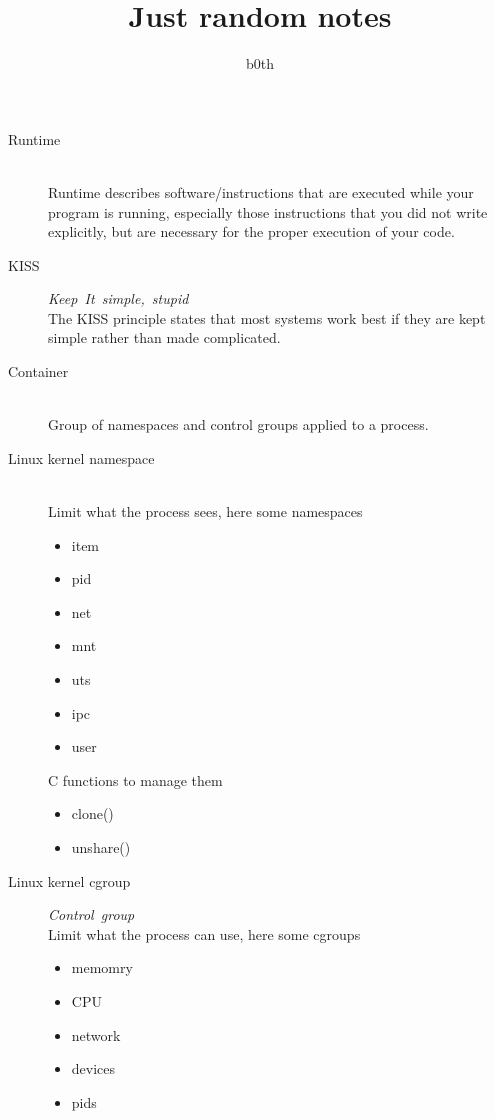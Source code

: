 \documentclass{article}
\title{Just random notes}
\author{b0th}
\begin{document}
\maketitle

\begin{description}
    \item[Runtime] \mbox{}\\Runtime describes software/instructions that are executed while your program is running, especially those instructions that you did not write explicitly, but are necessary for the proper execution of your code.
    \item[KISS] \mbox{\textit{Keep It simple, stupid}}\\ The KISS principle states that most systems work best if they are kept simple rather than made complicated.
    \item[Container] \mbox{}\\ Group of namespaces and control groups applied to a process.
    \item[Linux kernel namespace] \mbox{}\\ Limit what the process sees, here some namespaces
    
    \begin{itemize}
        \item item
        \item pid
        \item net
        \item mnt
        \item uts
        \item ipc
        \item user
    \end{itemize}

    C functions to manage them

    \begin{itemize}
        \item clone()
        \item unshare()
    \end{itemize}

    \item[Linux kernel cgroup] \mbox{\textit{Control group}}\\ Limit what the process can use, here some cgroups
    \begin{itemize}
        \item memomry
        \item CPU
        \item network
        \item devices
        \item pids
    \end{itemize} 


\end{description}
\end{document}
